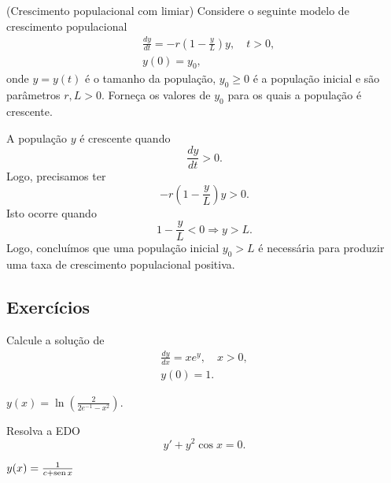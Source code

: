 \begin{exeresol}(Crescimento populacional com limiar)
  Considere o seguinte modelo de crescimento populacional
  \begin{align*}
    &\frac{dy}{dt} = -r\left(1 - \frac{y}{L}\right)y,\quad t>0,\\
    &y(0) = y_0,
  \end{align*}
  onde $y = y(t)$ é o tamanho da população, $y_0 \geq 0$ é a população inicial e são parâmetros $r, L > 0$. Forneça os valores de $y_0$ para os quais a população é crescente.
\end{exeresol}
\begin{resol}
  A população $y$ é crescente quando
  \begin{equation}
    \frac{dy}{dt} > 0.
  \end{equation}
  Logo, precisamos ter
  \begin{equation}
    -r\left(1 - \frac{y}{L}\right)y > 0.
  \end{equation}
  Isto ocorre quando
  \begin{equation}
    1 - \frac{y}{L} < 0 \Rightarrow y > L.
  \end{equation}
  Logo, concluímos que uma população inicial $y_0 > L$ é necessária para produzir uma taxa de crescimento populacional positiva.
\end{resol}

\subsection*{Exercícios}

\begin{exer}
  Calcule a solução de
  \begin{align}
    \frac{dy}{dx} = xe^y,\quad x>0,\\
    y(0) = 1.
  \end{align}
\end{exer}
\begin{resp}
  $y(x) = \ln\left(\frac{2}{2e^{-1}-x^2}\right)$.
\end{resp}

\begin{exer}
  Resolva a EDO
  \begin{equation}
    y' + y^2\cos x = 0.
  \end{equation}
\end{exer}
\begin{resp}
  $y(x) = \frac{1}{c + \operatorname{sen} x}$
\end{resp}

